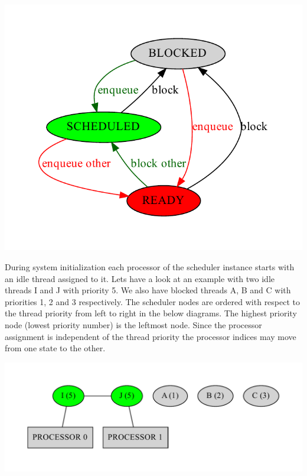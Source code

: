 \begin{DoxyImageNoCaption}
  \mbox{\includegraphics[width=\textwidth,height=\textheight/2,keepaspectratio=true]{dot_inline_dotgraph_4}}
\end{DoxyImageNoCaption}


During system initialization each processor of the scheduler instance starts with an idle thread assigned to it. Lets have a look at an example with two idle threads I and J with priority 5. We also have blocked threads A, B and C with priorities 1, 2 and 3 respectively. The scheduler nodes are ordered with respect to the thread priority from left to right in the below diagrams. The highest priority node (lowest priority number) is the leftmost node. Since the processor assignment is independent of the thread priority the processor indices may move from one state to the other.


\begin{DoxyImageNoCaption}
  \mbox{\includegraphics[width=\textwidth,height=\textheight/2,keepaspectratio=true]{dot_inline_dotgraph_5}}
\end{DoxyImageNoCaption}



